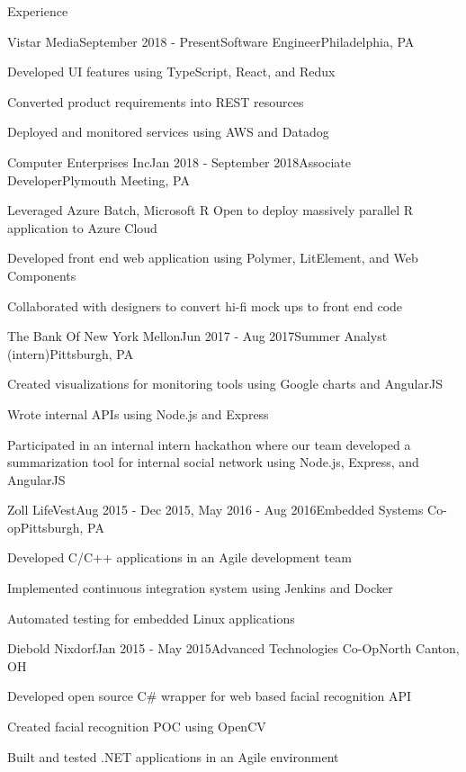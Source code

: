 \documentclass{resume} %
\begin{document}
\begin{rSection}{Experience}

\begin{rSubsection}{Vistar Media}{September 2018 - Present}{Software Engineer}{Philadelphia, PA}
\item Developed UI features using TypeScript, React, and Redux
\item Converted product requirements into REST resources
\item Deployed and monitored services using AWS and Datadog
\end{rSubsection}

\begin{rSubsection}{Computer Enterprises Inc}{Jan 2018 - September 2018}{Associate Developer}{Plymouth Meeting, PA}
\item Leveraged Azure Batch, Microsoft R Open to deploy massively parallel R application to Azure Cloud
\item Developed front end web application using Polymer, LitElement, and Web Components
\item Collaborated with designers to convert hi-fi mock ups to front end code
\end{rSubsection}

\begin{rSubsection}{The Bank Of New York Mellon}{Jun 2017 - Aug 2017}{Summer Analyst (intern)}{Pittsburgh, PA}
\item Created visualizations for monitoring tools using Google charts and AngularJS
\item Wrote internal APIs using Node.js and Express 
\item Participated in an internal intern hackathon where our team developed a summarization tool for internal social network using Node.js, Express, and AngularJS
\end{rSubsection}


\begin{rSubsection}{Zoll LifeVest}{Aug 2015 - Dec 2015, May 2016 - Aug 2016}{Embedded Systems Co-op}{Pittsburgh, PA}
\item Developed C/C++ applications in an Agile development team
\item Implemented continuous integration system using Jenkins and Docker
\item Automated testing for embedded Linux applications
\end{rSubsection}


\begin{rSubsection}{Diebold Nixdorf}{Jan 2015 - May 2015}{Advanced Technologies Co-Op}{North Canton, OH}
\item Developed open source C\# wrapper for web based facial recognition API
\item Created facial recognition POC using OpenCV
\item Built and tested .NET applications in an Agile environment
\end{rSubsection}

\end{rSection}
\end{document}
